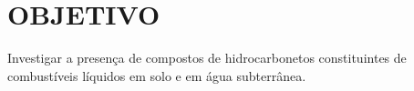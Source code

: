 \chapter{OBJETIVO}
	
 Investigar a presença de compostos de hidrocarbonetos constituintes de combustíveis líquidos em solo e em água subterrânea.